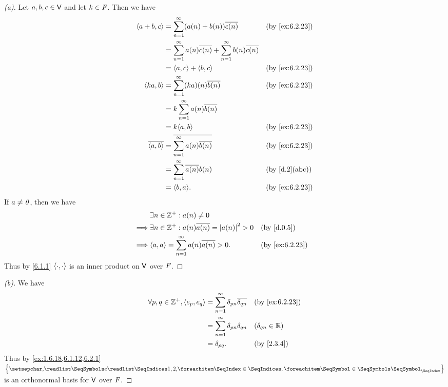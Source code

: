 \begin{proof}[(a)]
	Let \(a, b, c \in \mathsf{V}\) and let \(k \in \mathit{F}\).
	Then we have
	\begin{align*}
		\inn{a + b, c}    & = \sum_{n = 1}^\infty (a(n) + b(n)) \conj{c(n)}                               &  & \by{ex:6.2.23} \\
		                  & = \sum_{n = 1}^\infty a(n) \conj{c(n)} + \sum_{n = 1}^\infty b(n) \conj{c(n)}                     \\
		                  & = \inn{a, c} + \inn{b, c}                                                     &  & \by{ex:6.2.23} \\
		\inn{ka, b}       & = \sum_{n = 1}^\infty (ka)(n) \conj{b(n)}                                     &  & \by{ex:6.2.23} \\
		                  & = k \sum_{n = 1}^\infty a(n) \conj{b(n)}                                                          \\
		                  & = k \inn{a, b}                                                                &  & \by{ex:6.2.23} \\
		\conj{\inn{a, b}} & = \conj{\sum_{n = 1}^\infty a(n) \conj{b(n)}}                                 &  & \by{ex:6.2.23} \\
		                  & = \sum_{n = 1}^\infty \conj{a(n)} b(n)                                        &  & \by{d.2}[abc]  \\
		                  & = \inn{b, a}.                                                                 &  & \by{ex:6.2.23}
	\end{align*}
	If \(a \neq \mathit{0}\), then we have
	\begin{align*}
		         & \exists n \in \Z^+ : a(n) \neq 0                                             \\
		\implies & \exists n \in \Z^+ : a(n) \conj{a(n)} = \abs{a(n)}^2 > 0 &  & \by{d.0.5}     \\
		\implies & \inn{a, a} = \sum_{n = 1}^\infty a(n) \conj{a(n)} > 0.   &  & \by{ex:6.2.23}
	\end{align*}
	Thus by \cref{6.1.1} \(\left\langle\cdot, \cdot\right\rangle\) is an inner product on \(\mathsf{V}\) over \(\mathit{F}\).
\end{proof}

\begin{proof}[(b)]
	We have
	\begin{align*}
		\forall p, q \in \Z^+, \inn{e_p, e_q} & = \sum_{n = 1}^\infty \delta_{p n} \conj{\delta_{q n}} &  & \by{ex:6.2.23}        \\
		                                      & = \sum_{n = 1}^\infty \delta_{p n} \delta_{q n}        &  & (\delta_{q n} \in \R) \\
		                                      & = \delta_{p q}.                                        &  & \by{2.3.4}
	\end{align*}
	Thus by \cref{ex:1.6.18,6.1.12,6.2.1} \(\set{\seq{e}{1,2,}}\) is an orthonormal basis for \(\mathsf{V}\) over \(\mathit{F}\).
\end{proof}

